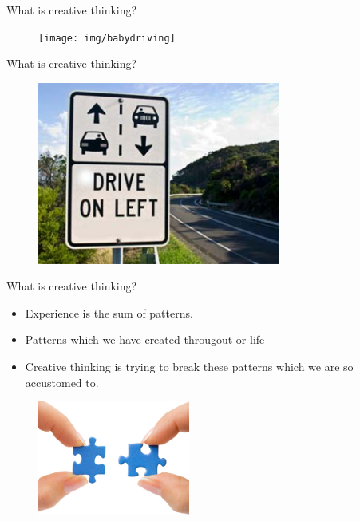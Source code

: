 \documentclass[notes]{beamer}
\begin{document}
\begin{frame}{What is \textcolor{HoGentAccent6}{creative} thinking?}
	\begin{figure}
		\texttt{[image: img/babydriving]}
	\end{figure}
\end{frame}

\begin{frame}{What is \textcolor{HoGentAccent6}{creative} thinking?}
	\begin{figure}
		\includegraphics[width=8cm]{img/drive.jpg}
	\end{figure}
\end{frame}

\begin{frame}{What is \textcolor{HoGentAccent6}{creative} thinking?}
	\begin{itemize}
		\item Experience is the sum of patterns.
		\item Patterns which we have created througout or life
		\item \textcolor{HoGentAccent1}{Creative thinking} is trying to break these patterns which we are so accustomed to. 
	\end{itemize}

\begin{center}
	\begin{figure}
		\includegraphics[width=5cm]{img/puzzel.jpg}
	\end{figure}
\end{center}
\end{frame}
\end{document}
